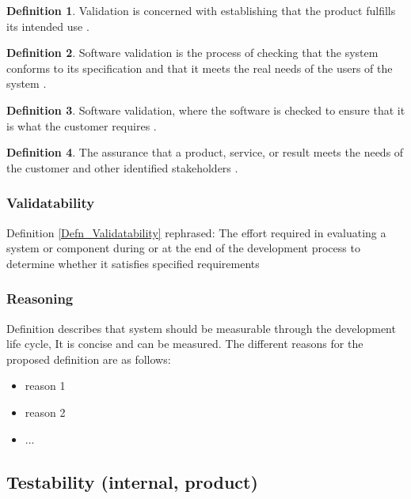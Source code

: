 \documentclass[letterpaper, cleveref]{lipics-v2019}
\newcommand{\authornote}[3]{\textcolor{#1}{[#3 ---#2]}}
\newcommand{\authornote}[3]{}
\newcommand{\oo}[1]{\authornote{magenta}{OO}{#1}} %
\newcommand{\notdone}[1]{\textcolor{red}{#1}}
\theoremstyle{definition}
\newtheorem{defn}{Definition}
\begin{document}
\begin{defn}
	Validation is concerned with establishing that the product fulfills its
	intended use \citep{van2008software}.
\end{defn}

\begin{defn}
  Software validation is the process of checking that the system conforms to
  its specification and that it meets the real needs of the users of the
  system \citep{sommerville}. %
\end{defn}

\begin{defn}
	Software validation, where the software is checked to ensure that it is
  what the customer requires \citep{sommerville}. %
\end{defn}

\begin{defn}
  The assurance that a product, service, or result meets the needs of the
  customer and other identified stakeholders \citep{project2017guide}.
\end{defn}

\begin{mybox}
\subsubsection*{Validatability}
Definition \ref{Defn_Validatability} rephrased:  The effort required in
evaluating a system or component during or at the end of the development
process to determine whether it satisfies specified requirements
\end{mybox}

\subsubsection*{Reasoning}

Definition describes that system should be measurable through the
development life cycle, It is concise and can be measured.  The
different reasons for the proposed definition are as follows:

\begin{itemize}
  \item reason 1
  \item reason 2
  \item ...
\end{itemize}


\subsection{Testability (internal, product)} %
\end{document}
